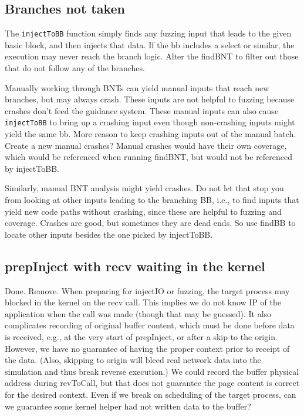 \documentclass[titlepage]{article}
\begin{document}
\begin{appendices}
\subsection{Branches not taken}
The {\tt injectToBB} function simply finds any fuzzing input that leads to the given basic block, and then injects that data.
If the bb includes a select or similar, the execution may never reach the branch logic.  Alter the findBNT to filter out those that do not
follow any of the branches.

Manually working through BNTs can yield manual inputs that reach new branches, but may always crash.  These inputs are not helpful to fuzzing because crashes don't 
feed the guidance system.  These manual inputs can also cause {\tt injectToBB} to bring up a crashing input even though non-crashing inputs might yield the same bb.
More reason to keep crashing inputs out of the manual batch.  Create a new manual crashes?  Manual crashes would have their own coverage, which would be referenced
when running findBNT, but would not be referenced by injectToBB.

Similarly, manual BNT analysis might yield crashes.  Do not let that stop you from looking at other inputs leading to the branching BB, i.e., to find inputs that
yield new code paths without crashing, since these are helpful to fuzzing and coverage.  Crashes are good, but sometimes they are dead ends.  So use findBB to locate other
inputs besides the one picked by injectToBB.

\subsection{prepInject with recv waiting in the kernel}
Done.  Remove.
\newline
When preparing for injectIO or fuzzing, the target process may blocked in the kernel on the recv call.  This implies we do not know IP of the application
when the call was made (though that may be guessed).  It also complicates recording of original buffer content, which must be done before data is received,
e.g., at the very start of prepInject, or after a skip to the origin.  However, we have no guarantee of having the proper context prior to receipt of the data.
(Also, skipping to origin will bleed real network data into the simulation and thus break reverse execution.)
We could record the buffer physical address during revToCall, but that does not guarantee the page content is correct for the desired context.  Even if we break on
scheduling of the target process, can we guarantee some kernel helper had not written data to the buffer?


\end{appendices}
\end{document}
